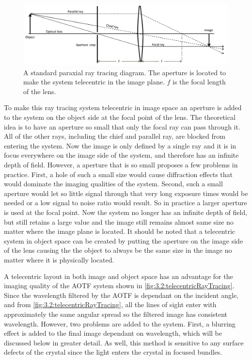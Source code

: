 \begin{figure}
    \includegraphics[width=1.0\textwidth]{./Images/3-2-RayTracing.pdf}
    \caption[Telecentric Ray Tracing Diagram]{A standard paraxial ray tracing diagram. The aperture is located to make the system telecentric in the image plane. $f$ is the focal length of the lens.}
    \label{fig:3.2:rayTracing}
\end{figure}

To make this ray tracing system telecentric in image space an aperture is added to the system on the object side at the focal point of the lens. The theoretical idea is to have an aperture so small that only the focal ray can pass through it. All of the other rays, including the chief and parallel ray, are blocked from entering the system. Now the image is only defined by a single ray and it is in focus everywhere on the image side of the system, and therefore has an infinite depth of field. However, a aperture that is so small proposes a few problems in practice. First, a hole of such a small size would cause diffraction effects that would dominate the imaging qualities of the system. Second, such a small aperture would let so little signal through that very long exposure times would be needed or a low signal to noise ratio would result. So in practice a larger aperture is used at the focal point. Now the system no longer has an infinite depth of field, but still retains a large value and the image still remains almost same size no matter where the image plane is located. It should be noted that a telecentric system in object space can be created by putting the aperture on the image side of the lens causing the the object to always be the same size in the image no matter where it is physically located.


A telecentric layout in both image and object space has an advantage for the imaging quality of the AOTF system shown in \autoref{fig:3.2:telecentricRayTracing}. Since the wavelength filtered by the AOTF is dependant on the incident angle, and from \autoref{fig:3.2:telecentricRayTracing}, all the lines of sight enter with approximately the same angular spread so the filtered image has consistent wavelength. However, two problems are added to the system. First, a blurring effect is added to the final image dependant on wavelength, which will be discussed below in greater detail. As well, this method is sensitive to any surface defects of the crystal since the light enters the crystal in focused bundles.

